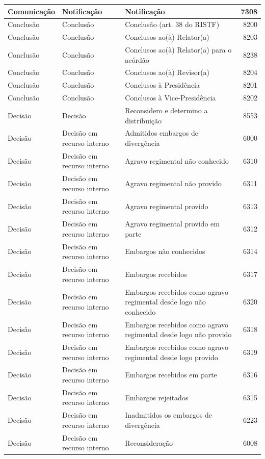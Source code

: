 \documentclass[
]{book}
\begin{document}
\begin{tabular}{l|l|l|r}
\hline
Comunicação & Notificação & Notificação & 7308\\
\hline
Conclusão & Conclusão & Conclusão (art. 38 do RISTF) & 8200\\
\hline
Conclusão & Conclusão & Conclusos ao(à) Relator(a) & 8203\\
\hline
Conclusão & Conclusão & Conclusos ao(à) Relator(a) para o acórdão & 8238\\
\hline
Conclusão & Conclusão & Conclusos ao(à) Revisor(a) & 8204\\
\hline
Conclusão & Conclusão & Conclusos à Presidência & 8201\\
\hline
Conclusão & Conclusão & Conclusos à Vice-Presidência & 8202\\
\hline
Decisão & Decisão & Reconsidero e determino a distribuição & 8553\\
\hline
Decisão & Decisão em recurso interno & Admitidos embargos de divergência & 6000\\
\hline
Decisão & Decisão em recurso interno & Agravo regimental não conhecido & 6310\\
\hline
Decisão & Decisão em recurso interno & Agravo regimental não provido & 6311\\
\hline
Decisão & Decisão em recurso interno & Agravo regimental provido & 6313\\
\hline
Decisão & Decisão em recurso interno & Agravo regimental provido em parte & 6312\\
\hline
Decisão & Decisão em recurso interno & Embargos não conhecidos & 6314\\
\hline
Decisão & Decisão em recurso interno & Embargos recebidos & 6317\\
\hline
Decisão & Decisão em recurso interno & Embargos recebidos como agravo regimental desde logo não conhecido & 6320\\
\hline
Decisão & Decisão em recurso interno & Embargos recebidos como agravo regimental desde logo não provido & 6318\\
\hline
Decisão & Decisão em recurso interno & Embargos recebidos como agravo regimental desde logo provido & 6319\\
\hline
Decisão & Decisão em recurso interno & Embargos recebidos em parte & 6316\\
\hline
Decisão & Decisão em recurso interno & Embargos rejeitados & 6315\\
\hline
Decisão & Decisão em recurso interno & Inadmitidos os embargos de divergência & 6223\\
\hline
Decisão & Decisão em recurso interno & Reconsideração & 6008\\

\end{tabular}
\end{document}
